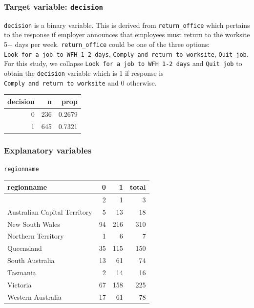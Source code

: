 \documentclass[
  a4paper,
]{article}
\numberwithin{equation}{section}
\numberwithin{figure}{section}
\numberwithin{table}{section}
\begin{document}
\subsubsection{\texorpdfstring{Target variable: \texttt{decision}}{Target variable: decision}}\label{target-variable-decision}

\texttt{decision} is a binary variable. This is derived from \texttt{return\_office} which pertains to the response if employer announces that employees must return to the worksite 5+ days per week. \texttt{return\_office} could be one of the three options: \texttt{Look\ for\ a\ job\ to\ WFH\ 1-2\ days}, \texttt{Comply\ and\ return\ to\ worksite}, \texttt{Quit\ job}. For this study, we collapse \texttt{Look\ for\ a\ job\ to\ WFH\ 1-2\ days} and \texttt{Quit\ job} to obtain the \texttt{decision} variable which is 1 if response is \texttt{Comply\ and\ return\ to\ worksite} and 0 otherwise.

\begin{table}[H]
\centering
\begin{tabular}{rrr}
\toprule
decision & n & prop\\
\midrule
0 & 236 & 0.2679\\
1 & 645 & 0.7321\\
\bottomrule
\end{tabular}
\end{table}

\subsubsection{Explanatory variables}\label{explanatory-variables}

\texttt{regionname}

\begin{table}[H]
\centering
\begin{tabular}{lrrr}
\toprule
regionname & 0 & 1 & total\\
\midrule
 & 2 & 1 & 3\\
Australian Capital Territory & 5 & 13 & 18\\
New South Wales & 94 & 216 & 310\\
Northern Territory & 1 & 6 & 7\\
Queensland & 35 & 115 & 150\\
South Australia & 13 & 61 & 74\\
Tasmania & 2 & 14 & 16\\
Victoria & 67 & 158 & 225\\
Western Australia & 17 & 61 & 78\\
\bottomrule
\end{tabular}
\end{table}
\end{document}
